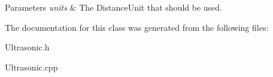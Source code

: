 \begin{DoxyParams}{Parameters}
{\em units} & The DistanceUnit that should be used. \\
\hline
\end{DoxyParams}


The documentation for this class was generated from the following files:\begin{DoxyCompactItemize}
\item 
Ultrasonic.h\item 
Ultrasonic.cpp\end{DoxyCompactItemize}

